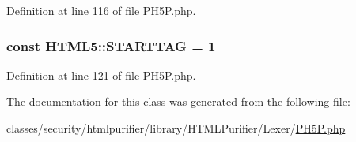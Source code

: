 Definition at line 116 of file P\+H5\+P.\+php.

\hypertarget{classHTML5_a94502c69fea29c30b3c2a74fc729a60d}{
\subsubsection[{S\+T\+A\+R\+T\+T\+A\+G}]{\setlength{\rightskip}{0pt plus 5cm}const H\+T\+M\+L5\+::\+S\+T\+A\+R\+T\+T\+A\+G = 1}}\label{classHTML5_a94502c69fea29c30b3c2a74fc729a60d}


Definition at line 121 of file P\+H5\+P.\+php.



The documentation for this class was generated from the following file\+:\begin{DoxyCompactItemize}
\item 
classes/security/htmlpurifier/library/\+H\+T\+M\+L\+Purifier/\+Lexer/\hyperlink{PH5P_8php}{P\+H5\+P.\+php}\end{DoxyCompactItemize}
